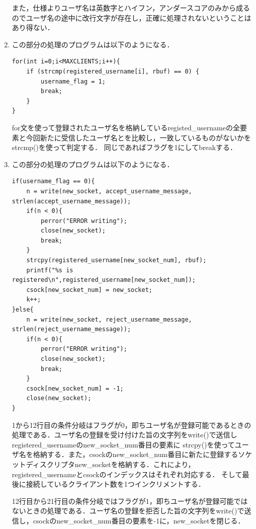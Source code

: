 \documentclass[dvipdfmx]{jarticle}
\begin{document}
\begin{enumerate}
    また，仕様よりユーザ名は英数字とハイフン，アンダースコアのみから成るのでユーザ名の途中に改行文字が存在し，正確に処理されないということはあり得ない．
    \item この部分の処理のプログラムは以下のようになる．
    \begin{lstlisting}
for(int i=0;i<MAXCLIENTS;i++){
    if (strcmp(registered_username[i], rbuf) == 0) {
        username_flag = 1;
        break;
    }
}
    \end{lstlisting}
    for文を使って登録されたユーザ名を格納しているregisted\_usernameの全要素と今回新たに受信したユーザ名とを比較し，一致しているものがないかをstrcmp()を使って判定する．
    同じであればフラグを1にしてbreakする．
    \item この部分の処理のプログラムは以下のようになる．
    \begin{lstlisting}
if(username_flag == 0){
    n = write(new_socket, accept_username_message, strlen(accept_username_message));
    if(n < 0){
        perror("ERROR writing");
        close(new_socket);
        break;
    }
    strcpy(registered_username[new_socket_num], rbuf);
    printf("%s is registered\n",registered_username[new_socket_num]);
    csock[new_socket_num] = new_socket;
    k++;
}else{
    n = write(new_socket, reject_username_message, strlen(reject_username_message));
    if(n < 0){
        perror("ERROR writing");
        close(new_socket);
        break;
    }
    csock[new_socket_num] = -1;
    close(new_socket);
}
        \end{lstlisting}
        1から12行目の条件分岐はフラグが0，即ちユーザ名が登録可能であるときの処理である．ユーザ名の登録を受け付けた旨の文字列をwrite()で送信しregistered\_usernameのnew\_socket\_num番目の要素に
        strcpy()を使ってユーザ名を格納する．また，csockのnew\_socket\_num番目に新たに登録するソケットディスクリプタnew\_socketを格納する．これにより，registered\_usernameとcsockのインデックスはそれぞれ対応する．
        そして最後に接続しているクライアント数を1つインクリメントする．

        12行目から21行目の条件分岐ではフラグが1，即ちユーザ名が登録可能ではないときの処理である．ユーザ名の登録を拒否した旨の文字列をwrite()で送信し，csockのnew\_socket\_num番目の要素を-1に，new\_socketを閉じる．
    \end{enumerate}
\end{document}
